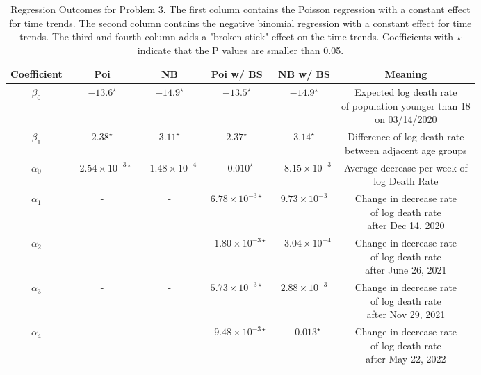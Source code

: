 \documentclass[12pt]{article}
\begin{document}
\begin{enumerate}[(a)]
	\begin{table}[htbp]
		\centering
		\begin{tabular}{cccccc}
			\toprule
			Coefficient & Poi & NB & Poi w/ BS & NB w/ BS & Meaning\\
			\midrule
			$\beta_{0}$ & $-13.6^\star$ & $-14.9^\star$ & $-13.5^\star$ & $-14.9^\star$ & \makecell{Expected log death rate \\of population younger than 18\\ on 03/14/2020 } \\ 
			\addlinespace[0.2cm]
			$\beta_{1}$ & $2.38^\star$ & $3.11^\star$ & $2.37^\star$ & $3.14^\star$ & \makecell{Difference of log death rate \\between adjacent age groups }\\
			\addlinespace[0.2cm]
			$\alpha_{0}$ & $-2.54\times 10^{-3\star}$ & $-1.48\times 10^{-4}$ & $-0.010^\star$ & $-8.15\times 10^{-3}$ & \makecell{Average decrease per week of \\ log Death Rate }\\
			\addlinespace[0.2cm]
			$\alpha_{1}$ & - & - & $6.78\times 10^{-3\star}$  & $9.73\times 10^{-3}$ & \makecell{Change in decrease rate \\ of log death rate\\ after Dec 14, 2020}\\
			\addlinespace[0.2cm]
			$\alpha_{2}$ & - & - & $-1.80\times 10^{-3\star}$ & $-3.04\times 10^{-4}$ & \makecell{Change in decrease rate \\ of log death rate\\ after June 26, 2021}\\
			\addlinespace[0.2cm]
			$\alpha_{3}$ & - & - & $5.73\times 10^{-3\star}$ & $2.88\times 10^{-3}$ & \makecell{Change in decrease rate \\ of log death rate\\ after Nov 29, 2021}\\
			\addlinespace[0.2cm]
			$\alpha_{4}$ & - & - & $-9.48\times 10^{-3\star}$ & $-0.013^\star$ & \makecell{Change in decrease rate \\ of log death rate\\ after May 22, 2022}\\
			\bottomrule
		\end{tabular}
		\caption{Regression Outcomes for Problem 3. The first column contains the Poisson regression with a constant effect for time trends. The second column contains the negative binomial regression with a constant effect for time trends. The third and fourth column adds a "broken stick" effect on the time trends. Coefficients with $\star$ indicate that the P values are smaller than 0.05.}\label{p3table}
	\end{table}	
	
	
	
	
\end{enumerate}
\end{document}

